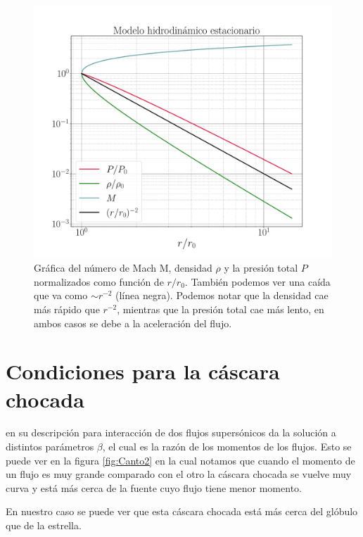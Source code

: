\documentclass{book}
\begin{document}
\begin{figure}[htb]
    \centering    \includegraphics[width=\textwidth]{Nuevas imagenes finales/C2_estructura.pdf}
    \caption{Gráfica del número de Mach M, densidad $\rho$ y la presión total $P$ normalizados como función de $r/r_0$. También podemos ver una caída que va como $\sim r^{-2}$ (línea negra). Podemos notar que la densidad cae más rápido que $r^{-2}$, mientras que la presión total cae más lento, en ambos casos se debe a la aceleración del flujo.
    }
    \label{fig:grafica_C2}
\end{figure}

\section{Condiciones para la cáscara chocada}

\cite{Canto:1996} en su descripción para interacción de dos flujos supersónicos da la solución a distintos parámetros $\beta$, el cual es la razón de los momentos de los flujos. Esto se puede ver en la figura \ref{fig:Canto2} en la cual notamos que cuando el momento de un flujo es muy  grande comparado con el otro la cáscara chocada se vuelve muy curva y está más cerca de la fuente cuyo flujo tiene menor momento.

En nuestro caso se puede ver que esta cáscara chocada está más cerca del glóbulo que de la estrella.
\end{document}
